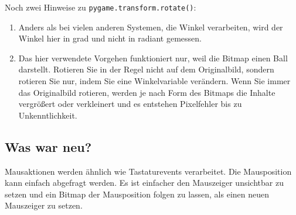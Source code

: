
Noch zwei Hinweise zu \texttt{pygame.transform.rotate()}:
\begin{enumerate}
	\item Anders als bei vielen anderen Systemen, die Winkel verarbeiten, wird der Winkel hier in \gls{grad} und nicht in \gls{radiant} gemessen.
	\item Das hier verwendete Vorgehen funktioniert nur, weil die Bitmap einen Ball darstellt. Rotieren Sie in der Regel nicht auf dem Originalbild, sondern rotieren Sie nur, indem Sie eine Winkelvariable verändern. Wenn Sie immer das Originalbild rotieren, werden je nach Form des Bitmaps die Inhalte vergrößert oder verkleinert und es entstehen Pixelfehler bis zu Unkenntlichkeit.
\end{enumerate}

\newpage
\subsection*{Was war neu?}

Mausaktionen werden ähnlich wie Tastaturevents verarbeitet. Die Mausposition kann einfach abgefragt werden. Es ist einfacher den Mauszeiger unsichtbar zu setzen und ein Bitmap der Mausposition folgen zu lassen, als einen neuen Mauszeiger zu setzen.

